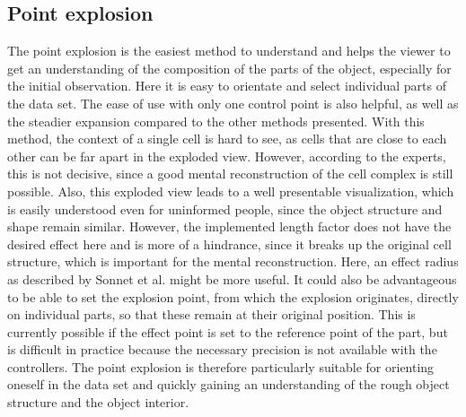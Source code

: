 \subsection{Point explosion}
The point explosion is the easiest method to understand and helps the viewer to get an understanding of the composition of the parts of the object, especially for the initial observation.
Here it is easy to orientate and select individual parts of the data set.
The ease of use with only one control point is also helpful, as well as the steadier expansion compared to the other methods presented.
With this method, the context of a single cell is hard to see, as cells that are close to each other can be far apart in the exploded view. However, according to the experts, this is not decisive, since a good mental reconstruction of the cell complex is still possible. Also, this exploded view leads to a well presentable visualization, which is easily understood even for uninformed people, since the object structure and shape remain similar.
However, the implemented length factor does not have the desired effect here and is more of a hindrance, since it breaks up the original cell structure, which is important for the mental reconstruction.
Here, an effect radius as described by Sonnet et al. might be more useful.
It could also be advantageous to be able to set the explosion point, from which the explosion originates, directly on individual parts, so that these remain at their original position.
This is currently possible if the effect point is set to the reference point of the part, but is difficult in practice because the necessary precision is not available with the controllers.
The point explosion is therefore particularly suitable for orienting oneself in the data set and quickly gaining an understanding of the rough object structure and the object interior.

